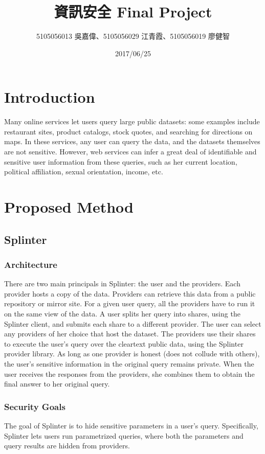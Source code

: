 \documentclass[12pt,a4paper]{article}
\title{\huge 資訊安全 Final Project} %
\author{5105056013 吳嘉偉、5105056029 江青霞、5105056019 廖健智} %
\date{2017/06/25} %
\begin{document}
\clearpage
\maketitle %

\begin{multicols}{2}

\section{Introduction}
Many online services let users query large public 
datasets: some examples include restaurant sites, 
product catalogs, stock quotes, and searching for 
directions on maps. In these services, any user can 
query the data, and the datasets themselves are not 
sensitive. However, web services can infer a great 
deal of identifiable and sensitive user information 
from these queries, such as her current location, 
political affiliation, sexual orientation, income, 
etc.
		
\section{Proposed Method}
\subsection{Splinter}
\subsubsection{Architecture}
There are two main principals in Splinter: the user 
and the providers. Each provider hosts a copy of 
the data. Providers can retrieve this data from a 
public repository or mirror site. For a given user 
query, all the providers have to run it on the same 
view of the data. 
  A user splits her query into shares, using the 
Splinter client, and submits each share to a 
different provider. The user can select any 
providers of her choice that host the dataset. The 
providers use their shares to execute the user’s 
query over the cleartext public data, using the 
Splinter provider library. As long as one provider 
is honest (does not collude with others), the 
user’s sensitive information in the original query 
remains private. When the user receives the 
responses from the providers, she combines them to 
obtain the final answer to her original query.

\subsubsection{Security Goals}
The goal of Splinter is to hide sensitive 
parameters in a user's query. Specifically, 
Splinter lets users run parametrized queries, where 
both the parameters and query results are hidden 
from providers.


\end{multicols}
\end{document}
